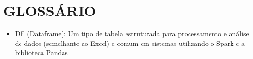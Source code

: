 \chapter*{GLOSSÁRIO}
\begin{itemize}
    \item DF (Dataframe): Um tipo de tabela estruturada para processamento e análise de dados (semelhante ao Excel) e comum em sistemas utilizando o Spark e a biblioteca Pandas
\end{itemize}

